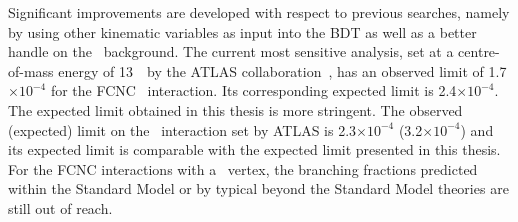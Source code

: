 Significant improvements are developed with respect to previous searches, namely by using other kinematic variables as input into the BDT as well as a better handle on the \NPL\ background.  The current  most sensitive analysis, set at a centre-of-mass energy of 13~\TeV\ by the ATLAS collaboration~\cite{ATLAS-CONF-2017-070}, has an observed limit of 1.7$\times 10^{-4}$ for the FCNC \Zut\ interaction. Its corresponding expected limit is 2.4$\times 10^{-4}$.  The expected limit  obtained in this thesis is more stringent.  The  observed (expected) limit on the \Zct\ interaction set by ATLAS is 2.3$\times 10^{-4}$ (3.2$\times 10^{-4}$) and its expected limit is comparable with the expected limit presented  in this thesis.  For the FCNC interactions with a \tZq\ vertex, the branching fractions predicted within the Standard Model or by typical beyond the Standard Model theories are still out of reach. 



